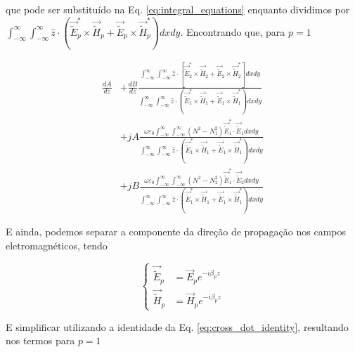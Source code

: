 \documentclass[11pt]{article} %
\newcommand{\tildee}{ \vec{\tilde{E}}}
\newcommand{\tildeh}{ \vec{\tilde{H}}}
\newcommand{\epsz}{\varepsilon_0}
\newcommand{\couplingdenom}{ \int_{-\infty}^\infty \int_{-\infty}^\infty \hat{z}\cdot\left(\tildee_p^*\times\tildeh_p+\tildee_p\times\tildeh_p^*\right) dxdy }
\newcommand{\couplingdenomone}{ \int_{-\infty}^\infty \int_{-\infty}^\infty \hat{z}\cdot\left(\tildee_1^*\times\tildeh_1+\tildee_1\times\tildeh_1^*\right) dxdy }
\begin{document}
que pode ser substituído na Eq. \ref{eq:integral_equations} enquanto dividimos por $ \couplingdenom $. Encontrando que, para $p=1$

\begin{equation}\label{eq:Eq_p1}
\begin{split}
\frac{dA}{dz} &+ \frac{dB}{dz}\frac{  \int_{-\infty}^\infty \int_{-\infty}^\infty \hat{z}\cdot\left[ \tildee_2^*\times\tildeh_2 + \tildee_2\times\tildeh_2^* \right] dxdy }{\couplingdenomone} \\
&+ jA \frac{\omega\epsz \int_{-\infty}^\infty \int_{-\infty}^\infty \left(N^2-N_1^2\right)\tildee_1^*\cdot\tildee_1 dxdy}{\couplingdenomone} \\
&+ jB \frac{\omega\epsz \int_{-\infty}^\infty \int_{-\infty}^\infty \left(N^2-N_2^2\right)\tildee_1^*\cdot\tildee_2 dxdy}{\couplingdenomone}
\end{split}
\end{equation}

E ainda, podemos separar a componente da direção de propagação nos campos eletromagnéticos, tendo

\begin{equation*}
\left\{
\begin{split}
\tildee_p &= \vec{E}_pe^{-i\beta_p z} \\
\tildeh_p &= \vec{H}_pe^{-i\beta_p z}
\end{split}
\right.
\end{equation*}

E simplificar utilizando a identidade da Eq. \ref{eq:cross_dot_identity}, resultando nos termos para $p=1$
\end{document}
